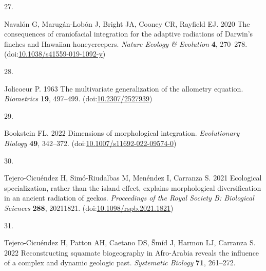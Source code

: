 \documentclass[
  11pt,
]{article}
\newlength{\cslhangindent}
\newlength{\csllabelwidth}
\newlength{\cslentryspacingunit} %
\newenvironment{CSLReferences}[2] %
 {%
  \setlength{\parindent}{0pt}
  \ifodd #1
  \let\oldpar\par
  \def\par{\hangindent=\cslhangindent\oldpar}
  \fi
  \setlength{\parskip}{#2\cslentryspacingunit}
 }%
 {}
\newcommand{\CSLLeftMargin}[1]{\parbox[t]{\csllabelwidth}{#1}}
\newcommand{\CSLRightInline}[1]{\parbox[t]{\linewidth - \csllabelwidth}{#1}\break}
\providecommand{\DIFaddbegin}{} %
\providecommand{\DIFaddend}{} %
\providecommand{\DIFdelbegin}{} %
\providecommand{\DIFdelend}{} %
\newcommand{\DIFscaledelfig}{0.5}
\newlength{\DIFdelgraphicswidth} %
\newlength{\DIFdelgraphicsheight} %
\newcommand{\DIFaddincludegraphics}[2][]{{\color{blue}\fbox{\DIFOincludegraphics[#1]{#2}}}} %
\newcommand{\DIFdelincludegraphics}[2][]{%
\sbox{\DIFdelgraphicsbox}{\DIFOincludegraphics[#1]{#2}}%
\settoboxwidth{\DIFdelgraphicswidth}{\DIFdelgraphicsbox} %
\settoboxtotalheight{\DIFdelgraphicsheight}{\DIFdelgraphicsbox} %
\scalebox{\DIFscaledelfig}{%
\parbox[b]{\DIFdelgraphicswidth}{\usebox{\DIFdelgraphicsbox}\\[-\baselineskip] \rule{\DIFdelgraphicswidth}{0em}}\llap{\resizebox{\DIFdelgraphicswidth}{\DIFdelgraphicsheight}{%
\setlength{\unitlength}{\DIFdelgraphicswidth}%
\begin{picture}(1,1)%
\thicklines\linethickness{2pt} %
{\color[rgb]{1,0,0}\put(0,0){\framebox(1,1){}}}%
{\color[rgb]{1,0,0}\put(0,0){\line( 1,1){1}}}%
{\color[rgb]{1,0,0}\put(0,1){\line(1,-1){1}}}%
\end{picture}%
}\hspace*{3pt}}} %
} %
\DeclareRobustCommand{\DIFaddbegin}{\DIFOaddbegin \let\includegraphics\DIFaddincludegraphics} %
\DeclareRobustCommand{\DIFaddend}{\DIFOaddend \let\includegraphics\DIFOincludegraphics} %
\DeclareRobustCommand{\DIFdelbegin}{\DIFOdelbegin \let\includegraphics\DIFdelincludegraphics} %
\DeclareRobustCommand{\DIFdelend}{\DIFOaddend \let\includegraphics\DIFOincludegraphics} %
\begin{document}
\begin{CSLReferences}{0}{0}
\leavevmode{}%
\CSLLeftMargin{27. }%
\DIFdelbegin %
\DIFdelend \DIFaddbegin \CSLRightInline{Navalón G, Marugán-Lobón J, Bright JA, Cooney CR,
Rayfield EJ. 2020 The consequences of craniofacial integration for the
adaptive radiations of {D}arwin's finches and {H}awaiian honeycreepers.
\emph{Nature Ecology \& Evolution} \textbf{4}, 270--278.
(doi:\href{https://doi.org/10.1038/s41559-019-1092-y}{10.1038/s41559-019-1092-y})}
\DIFaddend 

\leavevmode{}%
\CSLLeftMargin{28. }%
\DIFdelbegin %
\DIFdelend \DIFaddbegin \CSLRightInline{Jolicoeur P. 1963 The multivariate generalization of the
allometry equation. \emph{Biometrics} \textbf{19}, 497--499.
(doi:\href{https://doi.org/10.2307/2527939}{10.2307/2527939})}
\DIFaddend 

\leavevmode{}%
\CSLLeftMargin{29. }%
\CSLRightInline{Bookstein FL. 2022 Dimensions of morphological
integration. \emph{Evolutionary Biology} \textbf{49}, 342--372.
(doi:\href{https://doi.org/10.1007/s11692-022-09574-0}{10.1007/s11692-022-09574-0})}

\leavevmode{}%
\CSLLeftMargin{30. }%
\CSLRightInline{Tejero-Cicuéndez H, Simó-Riudalbas M, Menéndez I,
Carranza S. 2021 Ecological specialization, rather than the island
effect, explains morphological diversification in an ancient radiation
of geckos. \emph{Proceedings of the Royal Society B: Biological
Sciences} \textbf{288}, 20211821.
(doi:\href{https://doi.org/10.1098/rspb.2021.1821}{10.1098/rspb.2021.1821})}

\leavevmode{}%
\CSLLeftMargin{31. }%
\DIFdelbegin %
\DIFdelend \DIFaddbegin \CSLRightInline{Tejero-Cicuéndez H, Patton AH, Caetano DS, Šmíd J,
Harmon LJ, Carranza S. 2022 Reconstructing squamate biogeography in
{A}fro-{A}rabia reveals the influence of a complex and dynamic geologic
past. \emph{Systematic Biology} \textbf{71}, 261--272.}
\DIFaddend 


\end{CSLReferences}
\end{document}
